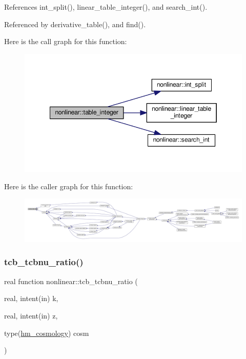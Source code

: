 References int\+\_\+split(), linear\+\_\+table\+\_\+integer(), and search\+\_\+int().



Referenced by derivative\+\_\+table(), and find().

Here is the call graph for this function\+:
\nopagebreak
\begin{figure}[H]
\begin{center}
\leavevmode
\includegraphics[width=346pt]{namespacenonlinear_a9982a6cac80109ad36dd796e77f372de_cgraph}
\end{center}
\end{figure}
Here is the caller graph for this function\+:
\nopagebreak
\begin{figure}[H]
\begin{center}
\leavevmode
\includegraphics[width=350pt]{namespacenonlinear_a9982a6cac80109ad36dd796e77f372de_icgraph}
\end{center}
\end{figure}
\mbox{\label{namespacenonlinear_a71f404d2d1de4ad126d2e43eea191621}} 
\subsubsection{\texorpdfstring{tcb\+\_\+tcbnu\+\_\+ratio()}{tcb\_tcbnu\_ratio()}}
{\footnotesize\ttfamily real function nonlinear\+::tcb\+\_\+tcbnu\+\_\+ratio (\begin{DoxyParamCaption}\item[{real, intent(in)}]{k,  }\item[{real, intent(in)}]{z,  }\item[{type(\mbox{\hyperlink{structnonlinear_1_1hm__cosmology}{hm\+\_\+cosmology}})}]{cosm }\end{DoxyParamCaption})\hspace{0.3cm}{\ttfamily [private]}}



